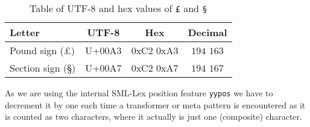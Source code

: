 \begin{table}
  \centering
  \begin{tabular}{|l|c|c|c|}
    \hline
    \textbf{Letter} & \textbf{UTF-8} & \textbf{Hex} & \textbf{Decimal} \\ \hline
    Pound sign (£)   & U+00A3 & 0xC2 0xA3 &  $194$ $163$ \\ \hline
    Section sign (§) & U+00A7 & 0xC2 0xA7 & $194$ $167$ \\ \hline
  \end{tabular}

  \caption{Table of UTF-8 and hex values of \texttt{£} and \texttt{§}}
  \label{tab:utf8-rule-values}
\end{table}

As we are using the internal SML-Lex position feature \texttt{yypos} we have to
decrement it by one each time a transformer or meta pattern is encountered as it
is counted as two characters, where it actually is just one (composite)
character.



